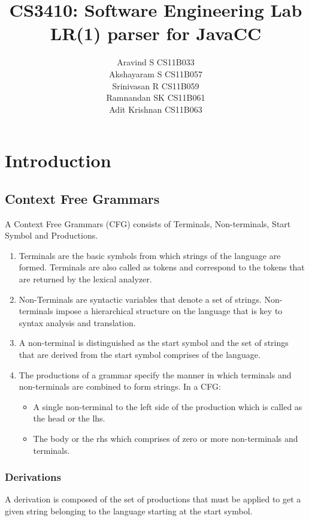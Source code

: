 \documentclass[oneside]{book}
\begin{document}
\title{\textbf{CS3410: Software Engineering Lab}\\ \textbf{LR(1) parser for JavaCC}}
\author{Aravind S CS11B033\\
    Akshayaram S CS11B057 \\
    Srinivasan R CS11B059 \\
    Ramnandan SK CS11B061 \\
    Adit Krishnan CS11B063
}

\maketitle

\tableofcontents

\chapter{Introduction}
\section{Context Free Grammars}
A Context Free Grammars (CFG) consists of Terminals, Non-terminals, Start Symbol and Productions.
\begin{enumerate}
\item Terminals are the basic symbols from which strings of the language are formed. Terminals are also called as tokens and correspond to the tokens that are returned by the lexical analyzer.
\item Non-Terminals are syntactic variables that denote a set of strings. Non-terminals impose a hierarchical structure on the language that is key to syntax analysis and translation.
\item A non-terminal is distinguished as the start symbol and the set of strings that are derived from the start symbol comprises of the language.
\item The productions of a grammar specify the manner in which terminals and non-terminals are combined to form strings. In a CFG:
\begin{itemize}
\item A single non-terminal to the left side of the production which is called as the head or the lhs.
\item The body or the rhs which comprises of zero or more non-terminals and terminals.
\end{itemize} 
\end{enumerate}

\subsection{Derivations}
A derivation is composed of the set of productions that must be applied to get a given string belonging to the language starting at the start symbol.
\end{document}
